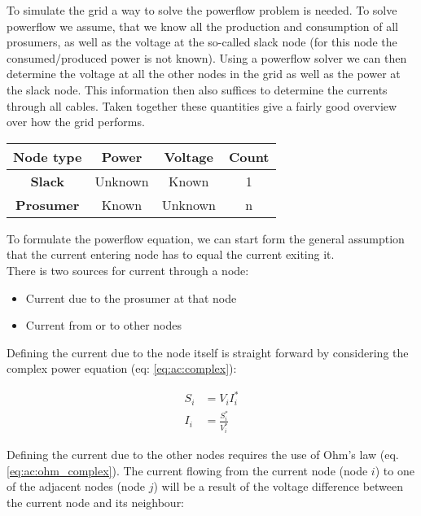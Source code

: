 To simulate the grid a way to solve the powerflow problem is needed. To solve powerflow we assume,
that we know all the production and consumption of all prosumers, as well as the voltage at the so-called slack
node (for this node the consumed/produced power is not known). Using a powerflow solver we can then determine the voltage
at all the other nodes in the grid as well as the power at the slack node. This information then also suffices to determine
the currents through all cables. Taken together these quantities give a fairly good overview over how the grid performs.

\begin{center}
    \begin{tabular}{ c c c c }
    Node type          & Power     & Voltage & Count \\ 
    \hline
    \textbf{Slack}     & Unknown   & Known   & 1     \\  
    \textbf{Prosumer}  & Known     & Unknown & n    
    \end{tabular}
\end{center}



To formulate the powerflow equation, we can start form the general assumption
that the current entering node has to equal the current exiting it.\\
There is two sources for current through a node:

\begin{itemize}
    \item Current due to the prosumer at that node
    \item Current from or to other nodes
\end{itemize}

Defining the current due to the node itself is straight forward by considering
the complex power equation (eq: \ref{eq:ac:complex}):

\begin{equation}
    \begin{aligned}
        S_i     &= V_iI_i^*\\
        I_i     &= \frac{S_i^*}{V_i^*}
    \end{aligned}
    \label{eq:pf:current_due_to_prosumer}
\end{equation}

Defining the current due to the other nodes requires the use of Ohm's law (eq. \ref{eq:ac:ohm_complex}).
The current flowing from the current node (node $i$)
to one of the adjacent nodes (node $j$) will be a result of the
voltage difference between the current node and its neighbour:


